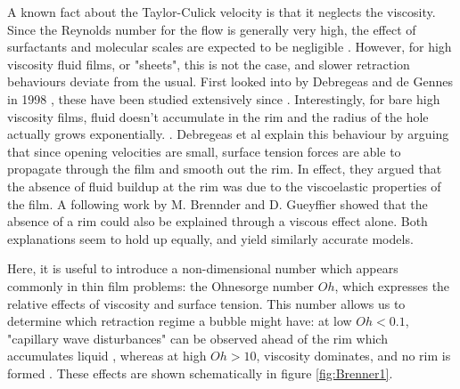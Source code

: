 \documentclass[a4paper,12pt]{article}
\numberwithin{equation}{section}
\numberwithin{figure}{section}
\numberwithin{table}{section}
\begin{document}
A known fact about the Taylor-Culick velocity is that it neglects the viscosity. Since the Reynolds number for the flow is generally very high, the effect of surfactants and molecular scales are expected to be negligible \cite{Petit2015, Brenner1999}. However, for high viscosity fluid films, or "sheets", this is not the case, and slower retraction behaviours deviate from the usual. First looked into by Debregeas and de Gennes in 1998 \cite{Debregeas1998}, these have been studied extensively since \cite{Brenner1999, Savva2009}. Interestingly, for bare high viscosity films, fluid doesn't accumulate in the rim and the radius of the hole actually grows exponentially. \cite{Debregeas1998}. Debregeas et al \cite{Debregeas1998} explain this behaviour by arguing that since opening velocities are small, surface tension forces are able to propagate through the film and smooth out the rim. In effect, they argued that the absence of fluid buildup at the rim was due to the viscoelastic properties of the film. A following work by M. Brennder and D. Gueyffier \cite{Brenner1999} showed that the absence of a rim could also be explained through a viscous effect alone. Both explanations seem to hold up equally, and yield similarly accurate models.

Here, it is useful to introduce a non-dimensional number which appears commonly in thin film problems: the Ohnesorge number $Oh$, which expresses the relative effects of viscosity and surface tension. This number allows us to determine which retraction regime a bubble might have: at low $Oh<0.1$, "capillary wave disturbances" can be observed ahead of the rim which accumulates liquid , whereas at high $Oh>10$, viscosity dominates, and no rim is formed \cite{Savva2009, Brenner1999}. These effects are shown schematically in figure \ref{fig:Brenner1}.
\end{document}
